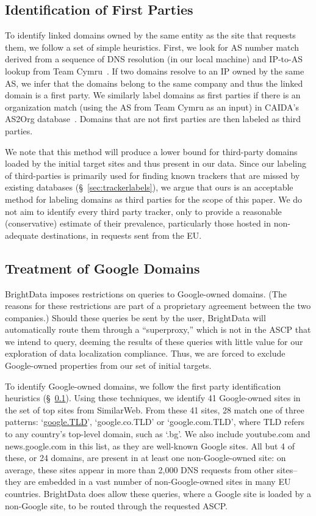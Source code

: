 \subsection{Identification of First Parties}
\label{sec:firstparty}
To identify linked domains owned by the same entity
as the site that requests them, 
we follow a set of simple heuristics.
First, we look for AS number match derived from a sequence of
DNS resolution (in our local machine) and IP-to-AS lookup from Team Cymru~\cite{cymru}. If two domains resolve to an IP owned by 
the same AS, we infer that the domains belong to the same company and
thus the linked domain is a first party.
We similarly label domains as first parties if there is an 
organization match (using the AS from Team Cymru as an input)
in CAIDA's AS2Org database~\cite{astwoorg}.
Domains that are not first parties are then labeled as third parties.

We note that this method will produce a lower bound for 
third-party domains loaded by the initial target sites and
thus present in our data. Since our labeling of third-parties
is primarily used for finding known trackers that are missed by 
existing databases (\S~\ref{sec:trackerlabels}), 
we argue that ours is an acceptable method for labeling
domains as third parties for the scope of this paper.
We do not aim to identify every third party tracker, 
only to provide a reasonable (conservative) estimate of their prevalence,
particularly those hosted in non-adequate destinations,
in requests sent from the EU. 

\subsection{Treatment of Google Domains}
\label{sec:googledoms}
BrightData imposes restrictions on queries to Google-owned domains. 
(The reasons for these restrictions are part of a proprietary agreement
between the two companies.)
Should these queries be sent by the user, BrightData will automatically route them
through a ``superproxy,'' which is not in the ASCP that we intend to query,
deeming the results of these queries with little value for our exploration of 
data localization compliance. Thus, we are forced to exclude Google-owned properties
from our set of initial targets.

To identify Google-owned domains, we follow the first party
identification heuristics (\S~\ref{sec:firstparty}). 
Using these techniques, we identify 41 Google-owned sites
in the set of top sites from SimilarWeb. 
From these 41 sites, 28 match one of three patterns: `\url{google.TLD}',
`google.co.TLD' or `google.com.TLD', where TLD refers to any country's top-level domain, such as 
`.bg'. We also include youtube.com and news.google.com in this list, as they are well-known Google sites. 
All but 4 of these, or 24 domains, 
are present in at least one non-Google-owned site: on average, these sites
appear in more than 2,000 DNS requests from other sites--they are embedded in a vast 
number of non-Google-owned sites
in many EU countries. 
BrightData does 
allow these queries, where a Google site is loaded by a non-Google site, 
to be routed through the requested ASCP.

